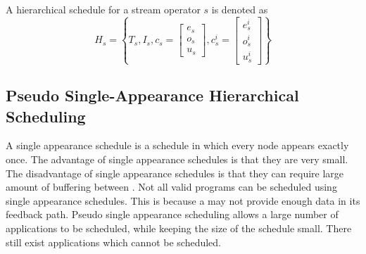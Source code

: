 A hierarchical schedule for a stream operator $s$ is denoted as
$$H_s = \left\{T_s, I_s, c_s = \left[\begin{array}{c}
e_s\\o_s\\u_s\end{array}\right], c^i_s =
\left[\begin{array}{c}e^i_s\\o^i_s\\u^i_s\end{array}\right]\right\}$$

\subsection{Pseudo Single-Appearance Hierarchical Scheduling}
\label{sec:sas}

\begin{comment}
\begin{figure}
\begin{minipage}{1.5in}
\centering \psfig{figure=pipeline-steady-state.eps,width=0.6in} \\
{\protect\small (a) A sample {\pipeline}}
\end{minipage}
~
\begin{minipage}{1.5in}
\centering \psfig{figure=splitjoin-steady-state.eps,width=1.2in} \\
{\protect\small (b) A sample {\splitjoin}}
\end{minipage}
~
\begin{minipage}{2.5in}
\centering \psfig{figure=feedback-hierarchical.eps,width=1.0in} \\
{\protect\small (c) A sample {\feedbackloop}.\\ $delay_{fl} = 15$ \\
The $L$ {\filter} has been flipped upside-down for clarity. \\$e_L
= 9, o_L = 5, u_L = 6$ }
\end{minipage}
\caption{Sample {\StreamIt} operators used for Pseudo
Single-Appearance Hierarchical Scheduling}
\label{fig:hierarchical-schedule}
\end{figure}
\end{comment}

A single appearance schedule is a schedule in which every node
appears exactly once. The advantage of single appearance schedules
is that they are very small. The disadvantage of single appearance
schedules is that they can require large amount of buffering
between {\filters}. Not all valid {\StreamIt} programs can be
scheduled using single appearance schedules. This is because a
{\feedbackloop} may not provide enough data in its feedback path.
Pseudo single appearance scheduling allows a large number of
applications to be scheduled, while keeping the size of the
schedule small. There still exist applications which cannot be
scheduled.

